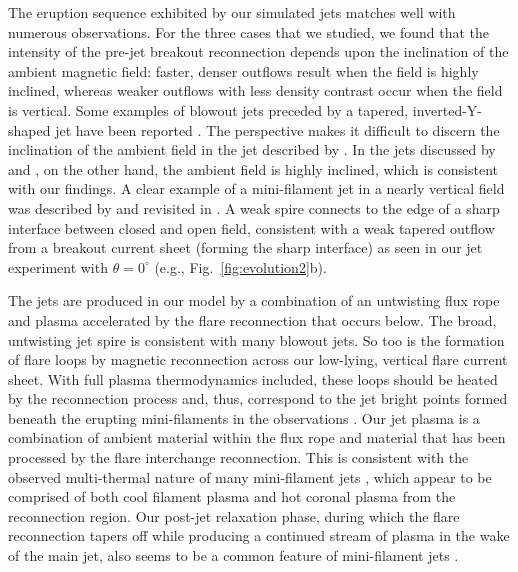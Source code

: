 \documentclass[twocolumn]{aastex6}
\begin{document}
The eruption sequence exhibited by our simulated jets matches well with numerous observations. For the three cases that we studied, we found that the intensity of the pre-jet breakout reconnection depends upon the inclination of the ambient magnetic field: faster, denser outflows result when the field is highly inclined, whereas weaker outflows with less density contrast occur when the field is vertical. Some examples of blowout jets preceded by a tapered, inverted-Y-shaped jet have been reported \citep[e.g.][]{Liu2011,Hong2016,Zhang2016b}. The perspective makes it difficult to discern the inclination of the ambient field in the jet described by \citet{Hong2016}. In the jets discussed by \citet{Liu2011} and \citet{Zhang2016b}, on the other hand, the ambient field is highly inclined, which is consistent with our findings. A clear example of a mini-filament jet in a nearly vertical field was {described by \citet{Moore2015} and revisited in \citet{Wyper2017}.} A weak spire connects to the edge of a sharp interface between closed and open field, consistent with a weak tapered outflow from a breakout current sheet (forming the sharp interface) as seen in our jet experiment with $\theta = 0^\circ$ (e.g., Fig.\ \ref{fig:evolution2}b).

The jets are produced in our model by a combination of an untwisting flux rope and plasma accelerated by the flare reconnection that occurs below. The broad, untwisting jet spire is consistent with many blowout jets. So too is the formation of flare loops by magnetic reconnection across our low-lying, vertical flare current sheet. With full plasma thermodynamics included, these loops should be heated by the reconnection process and, thus, correspond to the jet bright points formed beneath the erupting mini-filaments in the observations \citep[e.g.][]{Sterling2015}. Our jet plasma is a combination of ambient material within the flux rope and material that has been processed by the flare interchange reconnection. This is consistent with the observed multi-thermal nature of many mini-filament jets \citep[e.g.][]{Adams2014,Sterling2015}, which appear to be comprised of both cool filament plasma and hot coronal plasma from the reconnection region. Our post-jet relaxation phase, during which the flare reconnection tapers off while producing a continued stream of plasma in the wake of the main jet, also seems to be a common feature of mini-filament jets \citep[e.g.][]{Liu2011}.
\end{document}
